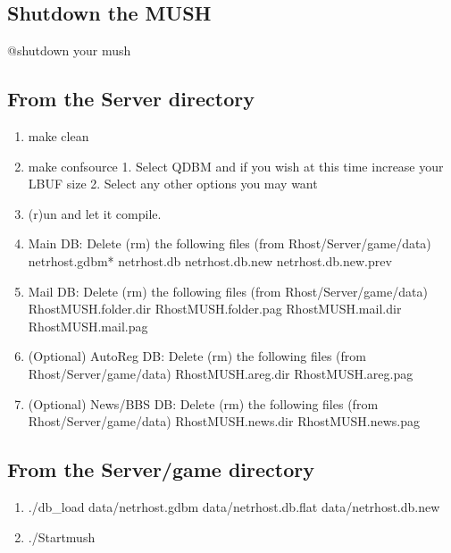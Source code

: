 \documentclass[letterpaper,10pt,english]{sphinxmanual}
\begin{document}
\subsection{Shutdown the MUSH}
\label{\detokenize{33-qdbm:shutdown-the-mush}}
\sphinxAtStartPar
@shutdown your mush


\subsection{From the Server directory}
\label{\detokenize{33-qdbm:from-the-server-directory}}\begin{enumerate}
%
\item {} 
\sphinxAtStartPar
make clean

\item {} 
\sphinxAtStartPar
make confsource
1.  Select QDBM and if you wish at this time increase your LBUF size
2.  Select any other options you may want

\item {} 
\sphinxAtStartPar
(r)un and let it compile.

\item {} 
\sphinxAtStartPar
Main DB: Delete (rm) the following files (from Rhost/Server/game/data)
netrhost.gdbm*
netrhost.db
netrhost.db.new
netrhost.db.new.prev

\item {} 
\sphinxAtStartPar
Mail DB: Delete (rm) the following files (from Rhost/Server/game/data)
RhostMUSH.folder.dir
RhostMUSH.folder.pag
RhostMUSH.mail.dir
RhostMUSH.mail.pag

\item {} 
\sphinxAtStartPar
(Optional) AutoReg DB: Delete (rm) the following files (from Rhost/Server/game/data)
RhostMUSH.areg.dir
RhostMUSH.areg.pag

\item {} 
\sphinxAtStartPar
(Optional) News/BBS DB: Delete (rm) the following files (from Rhost/Server/game/data)
RhostMUSH.news.dir
RhostMUSH.news.pag

\end{enumerate}


\subsection{From the Server/game directory}
\label{\detokenize{33-qdbm:from-the-server-game-directory}}\begin{enumerate}
%
\item {} 
\sphinxAtStartPar
./db\_load data/netrhost.gdbm data/netrhost.db.flat data/netrhost.db.new

\item {} 
\sphinxAtStartPar
./Startmush

\end{enumerate}
\end{document}
